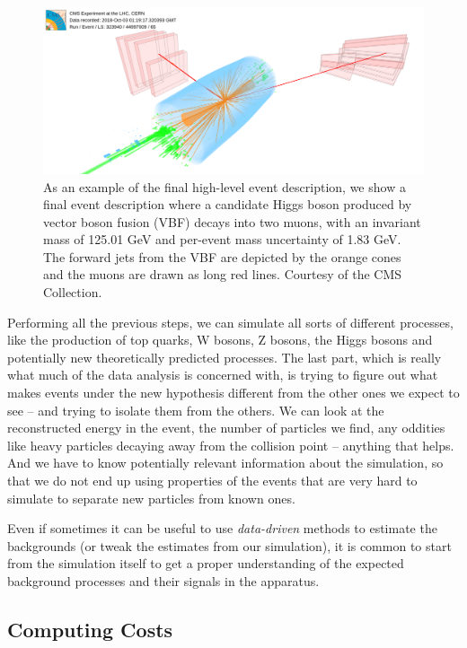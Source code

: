 \begin{figure}
    \centering
     \includegraphics[width=\columnwidth]{gfx/ch2/HIG-19-006_VBF_white.png}
    \caption[CMS Event]{As an example of the final high-level event description, we show a final event description  where a candidate Higgs boson produced by vector boson fusion (VBF) decays into two muons, with an invariant mass of 125.01 GeV and per-event mass uncertainty of 1.83 GeV. The forward jets from the VBF are depicted by the orange cones and the muons are drawn as long red lines. Courtesy of the CMS Collection.}
    \label{fig:cmsev}
\end{figure}


Performing all the previous steps, we can simulate all sorts of different processes, like the production of top quarks, W bosons, Z bosons, the Higgs bosons and potentially new theoretically predicted processes. The last part, which is really what much of the data analysis is concerned with, is trying to figure out what makes events under the new hypothesis different from the other ones we expect to see – and trying to isolate them from the others. We can look at the reconstructed energy in the event, the number of particles we find, any oddities like heavy particles decaying away from the collision point – anything that helps. And we have to know potentially relevant information about the simulation, so that we do not end up using properties of the events that are very hard to simulate to separate new particles from known ones. 

Even if sometimes it can be useful to use \emph{data-driven} methods to estimate the backgrounds (or tweak the estimates from our simulation), it is common to start from the simulation itself to get a proper understanding of the expected background processes and their signals in the apparatus.

\subsection{Computing Costs}

